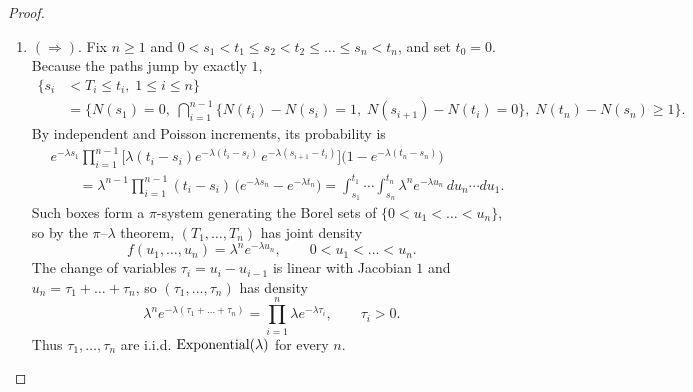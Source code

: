 \begin{proof}
\begin{enumerate}
			\item $(\Rightarrow)$. Fix $n \geq 1$ and $0 < s_1 < t_1 \leq s_2 < t_2 \leq \ldots \leq s_n < t_n$, and set $t_0 = 0$. Because the paths jump by exactly $1$,
				\begin{align}
					\{ s_i & < T_i \leq t_i, \; 1 \leq i \leq n \} \\
								 & = \Big\{ N(s_1) = 0, \; \bigcap_{i=1}^{n-1} \big\{ N(t_i) - N(s_i) = 1, \; N(s_{i+1}) - N(t_i) = 0 \big\}, \; N(t_n) - N(s_n) \geq 1 \Big\}.
				\end{align}
				By independent and Poisson increments, its probability is
				\begin{align}
					& e^{-\lambda s_1} \prod_{i=1}^{n-1} \Big[ \lambda (t_i - s_i) e^{-\lambda (t_i - s_i)} \, e^{-\lambda (s_{i+1} - t_i)} \Big] \big( 1 - e^{-\lambda (t_n - s_n)} \big) \\
					& \qquad = \lambda^{n-1} \prod_{i=1}^{n-1} (t_i - s_i) \, \big( e^{-\lambda s_n} - e^{-\lambda t_n} \big)
					= \int_{s_1}^{t_1} \!\! \cdots \int_{s_n}^{t_n} \lambda^n e^{-\lambda u_n} \, du_n \cdots du_1.
				\end{align}
				Such boxes form a $\pi$-system generating the Borel sets of $\{0 < u_1 < \ldots < u_n\}$, so by the $\pi$--$\lambda$ theorem, $(T_1, \ldots, T_n)$ has joint density
				\begin{equation}
					f(u_1, \ldots, u_n) = \lambda^n e^{-\lambda u_n}, \qquad 0 < u_1 < \ldots < u_n.
				\end{equation}
				The change of variables $\tau_i = u_i - u_{i-1}$ is linear with Jacobian $1$ and $u_n = \tau_1 + \ldots + \tau_n$, so $(\tau_1, \ldots, \tau_n)$ has density
				\begin{equation}
					\lambda^n e^{-\lambda (\tau_1 + \ldots + \tau_n)} = \prod_{i=1}^n \lambda e^{-\lambda \tau_i}, \qquad \tau_i > 0.
				\end{equation}
				Thus $\tau_1, \ldots, \tau_n$ are i.i.d.  $\operatorname{Exponential}(\lambda)$ for every $n$. 
		\end{enumerate}
	\end{proof}

